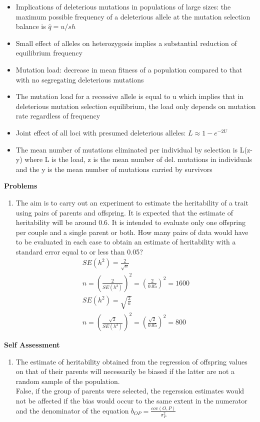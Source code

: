 \documentclass[12pt]{amsart}
\begin{document}
\begin{itemize}
\item Implications of deleterious mutations in populations of large sizes: the maximum possible frequency of a deleterious allele at the mutation selection balance is $\hat{q} = u/sh$ 
\item Small effect of alleles on heterozygosis implies a substantial reduction of equilibrium frequency
\item Mutation load: decrease in mean fitness of a population compared to that with no segregating deleterious mutations 
\item The mutation load for a recessive allele is equal to u which implies that in deleterious mutation selection equilibrium, the load only depends on mutation rate regardless of frequency
\item Joint effect of all loci with presumed deleterious alleles: $L \approx 1 - e^{-2U}$ 
\item The mean number of mutations eliminated per individual by selection is L(z-y) where L is the load, z is the mean number of del. mutations in individuals and the y is the mean number of mutations carried by survivors 
\end{itemize}

{\large \bf Problems}   
\begin{enumerate}
\item The aim is to carry out an experiment to estimate the heritability of a trait using pairs of parents and offspring. It is expected that the estimate of heritability will be around 0.6. It is intended to evaluate only one offspring per couple and a single parent or both. How many pairs of data would have to be evaluated in each case to obtain an estimate of heritability with a standard error equal to or less than 0.05?
\begin{gather*}
SE(h^2) = \frac{2}{\sqrt{n}} \\
n = (\frac{2}{SE(h^2)})^2 = (\frac{2}{0.05})^2 = 1600\\
SE(h^2) = \sqrt{\frac{2}{n}}\\
n = (\frac{\sqrt{2}}{SE(h^2)})^2 = (\frac{\sqrt{2}}{0.05})^2 = 800
\end{gather*}
\end{enumerate}

{\large \bf Self Assessment}
\begin{enumerate}
\item The estimate of heritability obtained from the regression of offspring values on that of their parents will necessarily be biased if the latter are not a random sample of the population.\\
False, if the group of parents were selected, the regerssion estimates would not be affected if the bias would occur to the same extent in the numerator and the denominator of the equation $b_{OP} = \frac{cov(O,P)}{\sigma^2_P}$\\

\end{enumerate}


\medskip
\end{document}

